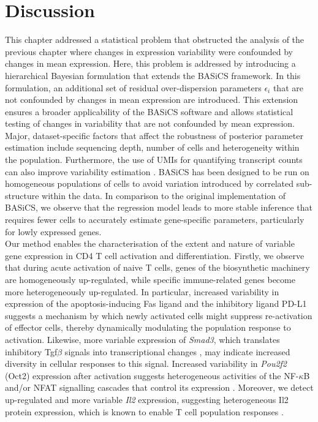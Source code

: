 
\section{Discussion}

This chapter addressed a statistical problem that obstructed the analysis of the previous chapter where changes in expression variability were confounded by changes in mean expression. Here, this problem is addressed by introducing a hierarchical Bayesian formulation that extends the BASiCS framework. In this formulation, an additional set of residual over-dispersion parameters $\epsilon_i$ that are not confounded by changes in mean expression are introduced. This extension ensures a broader applicability of the BASiCS software and allows statistical testing of changes in variability that are not confounded by mean expression.  \\ 

Major, dataset-specific factors that affect the robustness of posterior parameter estimation include sequencing depth, number of cells and heterogeneity within the population. Furthermore, the use of UMIs for quantifying transcript counts can also improve variability estimation \citep{Grun2014}. BASiCS has been designed to be run on homogeneous populations of cells to avoid variation introduced by correlated sub-structure within the data. In comparison to the original implementation of BASiCS, we observe that the regression model leads to more stable inference that requires fewer cells to accurately estimate gene-specific parameters, particularly for lowly expressed genes. \\

Our method enables the characterisation of the extent and nature of variable gene expression in CD4\plus{} T cell activation and differentiation. Firstly, we observe that during acute activation of naive T cells, genes of the biosynthetic machinery are homogeneously up-regulated, while specific immune-related genes become more heterogeneously up-regulated. In particular, increased variability in expression of the apoptosis-inducing Fas ligand \citep{Strasser2009} and the inhibitory ligand PD-L1 \citep{Chikuma2016} suggests a mechanism by which newly activated cells might suppress re-activation of effector cells, thereby dynamically modulating the population response to activation. Likewise, more variable expression of \emph{Smad3}, which translates inhibitory \gls{Tgf}$\beta$ signals into transcriptional changes \citep{Delisle2013}, may indicate increased diversity in cellular responses to this signal. Increased variability in \textit{Pou2f2} (Oct2) expression after activation suggests heterogeneous activities of the NF-$\kappa$B and/or \gls{NFAT} signalling cascades that control its expression \citep{Mueller2013}.
Moreover, we detect up-regulated and more variable \textit{Il2} expression, suggesting heterogeneous Il2 protein expression, which is known to enable T cell population responses \citep{Fuhrmann2016}. 

